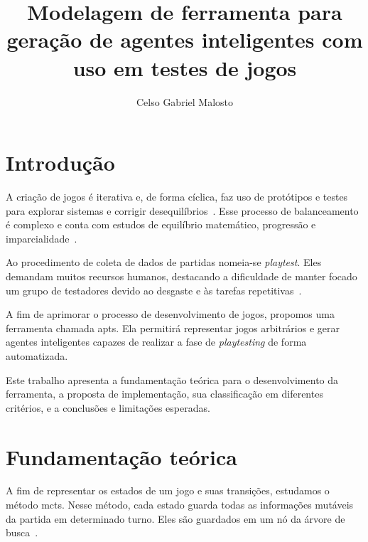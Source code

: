 \documentclass[12pt]{article}
\title{Modelagem de ferramenta para geração de agentes inteligentes com uso em testes de jogos}
\author{%
    Celso Gabriel Malosto\inst{1}%
}
\begin{document}
\maketitle

\begin{abstract}

\end{abstract}

\begin{resumo}

\end{resumo}

\section{Introdução}%
\label{sec:introducao}

A criação de jogos é iterativa e, de forma cíclica, faz uso de protótipos e testes para explorar sistemas e corrigir desequilíbrios~\cite{marcelo2009design, fullerton2019game}.
Esse processo de balanceamento é complexo e conta com estudos de equilíbrio matemático, progressão e imparcialidade~\cite{romeroGameBalance2021}.

Ao procedimento de coleta de dados de partidas nomeia-se \textit{playtest}.
Eles demandam muitos recursos humanos, destacando a dificuldade de manter focado um grupo de testadores devido ao desgaste e às tarefas repetitivas~\cite{trzewiczek2017}.

A fim de aprimorar o processo de desenvolvimento de jogos, propomos uma ferramenta chamada \gls{apts}.
Ela permitirá representar jogos arbitrários e gerar agentes inteligentes capazes de realizar a fase de \textit{playtesting} de forma automatizada.

Este trabalho apresenta a fundamentação teórica para o desenvolvimento da ferramenta, a proposta de implementação, sua classificação em diferentes critérios, e a conclusões e limitações esperadas.

\section{Fundamentação teórica}%
\label{sec:fundamentacao_teorica}

A fim de representar os estados de um jogo e suas transições, estudamos o método \gls{mcts}.
Nesse método, cada estado guarda todas as informações mutáveis da partida em determinado turno.
Eles são guardados em um nó da árvore de busca~\cite{kocsis2006bandit, coulom2006efficient}.
\end{document}
